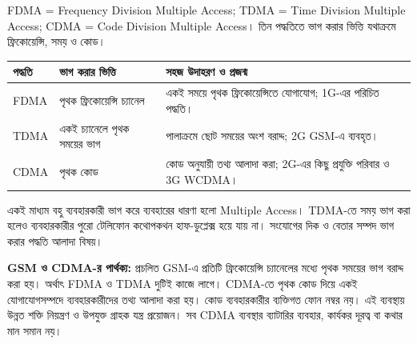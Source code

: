 FDMA = Frequency Division Multiple Access; TDMA = Time Division Multiple Access; CDMA = Code Division Multiple Access। তিন পদ্ধতিতে ভাগ করার ভিত্তি যথাক্রমে ফ্রিকোয়েন্সি, সময় ও কোড।
\begin{tabularx}{\linewidth}{|p{.18\linewidth}|X|X|}
\hline
\textbf{পদ্ধতি} & \textbf{ভাগ করার ভিত্তি} & \textbf{সহজ উদাহরণ ও প্রজন্ম}\\\hline
FDMA & পৃথক ফ্রিকোয়েন্সি চ্যানেল & একই সময়ে পৃথক ফ্রিকোয়েন্সিতে যোগাযোগ; 1G-এর পরিচিত পদ্ধতি।\\\hline
TDMA & একই চ্যানেলে পৃথক সময়ের ভাগ & পালাক্রমে ছোট সময়ের অংশ বরাদ্দ; 2G GSM-এ ব্যবহৃত।\\\hline
CDMA & পৃথক কোড & কোড অনুযায়ী তথ্য আলাদা করা; 2G-এর কিছু প্রযুক্তি পরিবার ও 3G WCDMA।\\\hline
\end{tabularx}
একই মাধ্যম বহু ব্যবহারকারী ভাগ করে ব্যবহারের ধারণা হলো Multiple Access। TDMA-তে সময় ভাগ করা হলেও ব্যবহারকারীর পুরো টেলিফোন কথোপকথন হাফ-ডুপ্লেক্স হয়ে যায় না। সংযোগের দিক ও বেতার সম্পদ ভাগ করার পদ্ধতি আলাদা বিষয়।

\textbf{GSM ও CDMA-র পার্থক্য:} প্রচলিত GSM-এ প্রতিটি ফ্রিকোয়েন্সি চ্যানেলের মধ্যে পৃথক সময়ের ভাগ বরাদ্দ করা হয়। অর্থাৎ FDMA ও TDMA দুটিই কাজে লাগে। CDMA-তে পৃথক কোড দিয়ে একই যোগাযোগসম্পদে ব্যবহারকারীদের তথ্য আলাদা করা হয়। কোড ব্যবহারকারীর ব্যক্তিগত ফোন নম্বর নয়। এই ব্যবস্থায় উন্নত শক্তি নিয়ন্ত্রণ ও উপযুক্ত গ্রাহক যন্ত্র প্রয়োজন। সব CDMA ব্যবস্থার ব্যাটারির ব্যবহার, কার্যকর দূরত্ব বা কথার মান সমান নয়।

